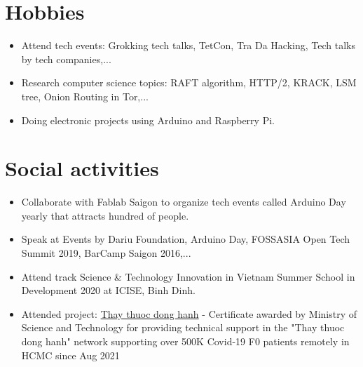 \documentclass[letterpaper,11pt]{article}
\newcommand{\resumeItemNornal}[1]{
  \item\small{
    {#1 \vspace{-2pt}}
  }
}
\newcommand{\resumeSubItemNormal}[1]{\resumeItemNornal{#1}\vspace{-4pt}}
\newcommand{\resumeSubHeadingListStart}{\begin{itemize}[leftmargin=*]}
\newcommand{\resumeSubHeadingListEnd}{\end{itemize}}
\begin{document}
\section{Hobbies}
  \resumeSubHeadingListStart
    \resumeSubItemNormal
      {Attend tech events: Grokking tech talks, TetCon, Tra Da Hacking, Tech talks by tech companies,...}
    \resumeSubItemNormal
      {Research computer science topics: RAFT algorithm, HTTP/2, KRACK, LSM tree, Onion Routing in Tor,...}
  \resumeSubItemNormal
      {Doing electronic projects using Arduino and Raspberry Pi.}
\resumeSubHeadingListEnd

\section{Social activities}
  \resumeSubHeadingListStart
    \resumeSubItemNormal
      {Collaborate with Fablab Saigon to organize tech events called Arduino Day yearly that attracts hundred of people.}
    \resumeSubItemNormal
      {Speak at Events by Dariu Foundation, Arduino Day, FOSSASIA Open Tech Summit 2019, BarCamp Saigon 2016,...}
    \resumeSubItemNormal
      {Attend track Science \& Technology Innovation in Vietnam Summer School in Development 2020 at ICISE, Binh Dinh.}
    \resumeSubItemNormal
      {Attended project: \href{https://thaythuocdonghanh.vn}{Thay thuoc dong hanh} - Certificate awarded by Ministry of Science and Technology for providing technical support in the "Thay thuoc dong hanh" network supporting over 500K Covid-19 F0 patients remotely in HCMC since Aug 2021}
\resumeSubHeadingListEnd



\end{document}
